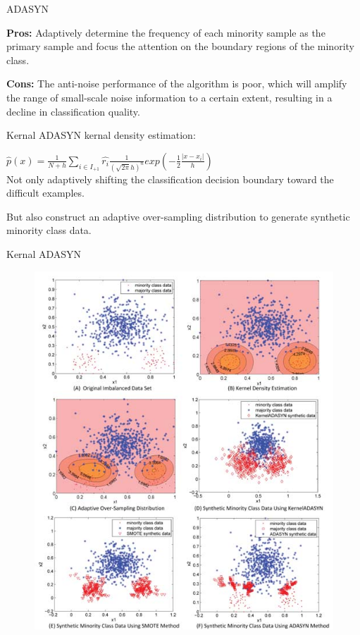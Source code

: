\documentclass[10pt]{beamer}
\begin{document}
\begin{frame}{ADASYN}

\textbf{ Pros:} Adaptively determine the frequency of each minority sample as the primary sample and focus the attention on the boundary regions of the minority class.

 \textbf{ Cons:} The anti-noise performance of the algorithm is poor, which will amplify the range of small-scale noise information to a certain extent, resulting in a decline in classification quality.
\end{frame}

\begin{frame}{Kernal ADASYN}
kernal density estimation:

$\hat{p}(x)=\frac{1}{N+h} \sum_{i\in I_{+1}} \hat{r_i} \frac{1}{(\sqrt{2\pi}h)^n} exp(-\frac{1}{2}\frac{|x-x_i|}{h})$\\
\vspace{2em}
Not only  adaptively shifting the classification decision boundary toward the difficult examples. 

But also construct an adaptive over-sampling distribution to generate synthetic minority class data.
\end{frame}

\begin{frame}{Kernal ADASYN}
\begin{figure}[!ht]
\centering
  \includegraphics[width=0.6\linewidth]{KADASYN}
\end{figure}
\end{frame}
\end{document}
